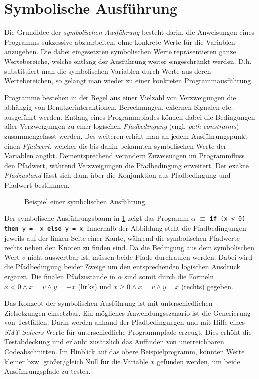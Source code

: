 \section{Symbolische Ausführung}

Die Grundidee der \emph{symbolischen Ausführung} besteht darin, die Anweisungen eines Programms sukzessive abzuarbeiten, ohne konkrete Werte für die Variablen anzugeben. Die dabei eingesetzten symbolischen Werte repräsentieren ganze Wertebereiche, welche entlang der Ausführung weiter eingeschränkt werden. D.h. substituiert man die symbolischen Variablen durch Werte aus deren Wertebereichen, so gelangt man wieder zu einer konkreten Programmausführung.

Programme bestehen in der Regel aus einer Vielzahl von Verzweigungen die abhängig von Benutzerinteraktionen, Berechnungen, externen Signalen etc. ausgeführt werden. Entlang eines Programmpfades können dabei die Bedingungen aller Verzweigungen zu einer logischen \emph{Pfadbedingung} (engl. \emph{path constraints}) zusammengefasst werden. Des weiteren erhält man an jedem Ausführungspunkt einen \emph{Pfadwert}, welcher die bis dahin bekannten symbolischen Werte der Variablen angibt. Dementsprechend verändern Zuweisungen im Programmfluss den Pfadwert, während Verzweigungen die Pfadbedingung erweitert. Der exakte \emph{Pfadzustand} lässt sich dann über die Konjunktion aus Pfadbedingung und Pfadwert bestimmen. \cite{Kneuper2008}

\begin{figure}[!hbt]
	\centering
	
	\caption{Beispiel einer symbolischen Ausführung}
	\label{fig:tree}
\end{figure}

\noindent
Der symbolische Ausführungsbaum in \cref{fig:tree} zeigt das Programm $\alpha$ $\equiv$ \texttt{\textbf{if} (x < 0) \textbf{then} y = -x \textbf{else} y = x}. Innerhalb der Abbildung steht die Pfadbedingungen jeweils auf der linken Seite einer Kante, während die symbolischen Pfadwerte rechts neben den Knoten zu finden sind. Da die Bedingung aus dem symbolischen Wert $v$ nicht auswertbar ist, müssen beide Pfade durchlaufen werden. Dabei wird die Pfadbedingung beider Zweige um den entsprechenden logischen Ausdruck ergänzt. Die finalen Pfadzustände in $\alpha$ sind somit durch die Formeln $x < 0 \wedge x = v \wedge y = -x$ (links) und $x \geq 0 \wedge x = v \wedge y = x$ (rechts) gegeben.

Das Konzept der symbolischen Ausführung ist mit unterschiedlichen Zielsetzungen einsetzbar. Ein mögliches Anwendungsszenario ist die Generierung von Testfällen. Darin werden anhand der Pfadbedingungen und mit Hilfe eines \emph{SMT Solvers} Werte für unterschiedliche Programmpfade erzeugt. Dies erhöht die Testabdeckung und erlaubt zusätzlich das Auffinden von unerreichbaren Codeabschnitten. Im Hinblick auf das obere Beispielprogramm, könnten Werte kleiner bzw. größer/gleich Null für die Variable $x$ gefunden werden, um beide Ausführungspfade zu testen.

